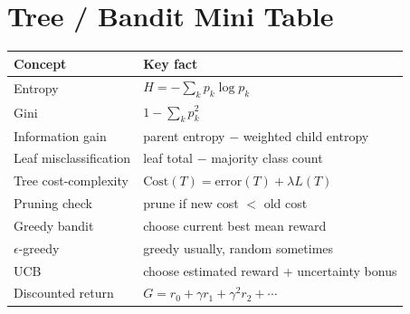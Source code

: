 \documentclass[11pt,landscape]{article}
\begin{document}
	\vspace{0.2em}
	
	\section{Tree / Bandit Mini Table}
	\begin{tabularx}{\linewidth}{@{}L{1.95in}L{4.95in}@{}}
		\toprule
		\textbf{Concept} & \textbf{Key fact} \\
		\midrule
		Entropy & $H=-\sum_k p_k\log p_k$ \\
		Gini & $1-\sum_k p_k^2$ \\
		Information gain & parent entropy $-$ weighted child entropy \\
		Leaf misclassification & leaf total $-$ majority class count \\
		Tree cost-complexity & $\mathrm{Cost}(T)=\mathrm{error}(T)+\lambda L(T)$ \\
		Pruning check & prune if new cost $<$ old cost \\
		Greedy bandit & choose current best mean reward \\
		$\epsilon$-greedy & greedy usually, random sometimes \\
		UCB & choose estimated reward + uncertainty bonus \\
		Discounted return & $G=r_0+\gamma r_1+\gamma^2r_2+\cdots$ \\
		\bottomrule
	\end{tabularx}
	
\end{document}
